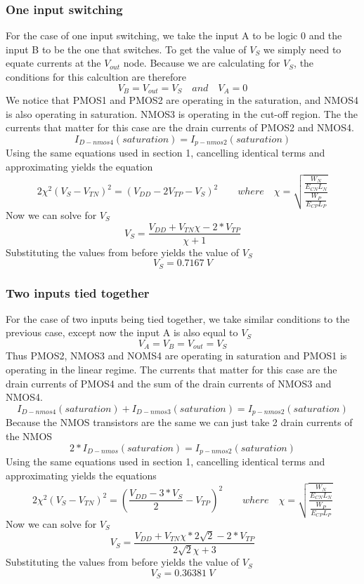 \documentclass[12pt]{article}
\begin{document}
\subsubsection{One input switching}
For the case of one input switching, we take the input A to be logic 0 and the input B to be the one that switches. To get the value of $V_S$
we simply need to equate currents at the $V_{out}$ node. Because we are calculating for $V_S$, the conditions for this calcultion are therefore
\[V_{B} = V_{out} = V_S \quad and \quad  V_A = 0\]
We notice that PMOS1 and PMOS2 are operating in the saturation, and NMOS4 is also operating in saturation. NMOS3 is operating in the cut-off region.
The the currents that matter for this case are the drain currents of PMOS2 and NMOS4.
\[I_{D-nmos4}(saturation) = I_{p-nmos2}(saturation) \]
Using the same equations used in section 1, cancelling identical terms and approximating yields the equation
\[2\chi^2(V_S - V_{TN})^2 = (V_{DD} - 2V_{TP} - V_S)^2 \quad\quad where \quad \chi = \sqrt{\frac{\frac{ W_N }{E_{CN}L_N  }}{\frac{ W_P }{E_{CP}L_P  }}} \]
Now we can solve for $V_S$
\[V_S = \frac{ V_{DD} + V_{TN}\chi - 2*V_{TP}  }{\chi + 1} \]
Substituting the values from before yields the value of $V_S$
\[V_S = \SI{0.7167}{V} \]
\subsubsection{Two inputs tied together}
For the case of two inputs being tied together, we take similar conditions to the previous case, except now the input A is also equal to $V_S$
\[V_A = V_{B} = V_{out} = V_S\]
Thus PMOS2, NMOS3 and NOMS4 are operating in saturation and PMOS1 is operating in the linear regime. The currents that matter for this case are the 
drain currents of PMOS4 and the sum of the drain currents of NMOS3 and NMOS4.
\[I_{D-nmos4}(saturation)+I_{D-nmos3}(saturation)= I_{p-nmos2}(saturation) \]
Because the NMOS transistors are the same we can just take 2 drain currents of the NMOS
\[2*I_{D-nmos}(saturation)= I_{p-nmos2}(saturation) \]
Using the same equations used in section 1, cancelling identical terms and approximating yields the equations
\[2\chi^2(V_S - V_{TN})^2 = (\frac{V_{DD} - 3*V_S}{2} - V_{TP})^2 \quad\quad where \quad \chi = \sqrt{\frac{\frac{ W_N }{E_{CN}L_N  }}{\frac{ W_P }{E_{CP}L_P  }}} \]
Now we can solve for $V_S$
\[V_S = \frac{ V_{DD} + V_{TN}\chi*2\sqrt{2} - 2*V_{TP}}{2\sqrt{2}\chi + 3} \]
Substituting the values from before yields the value of $V_S$
\[V_S = \SI{0.36381}{V} \]
\end{document}
